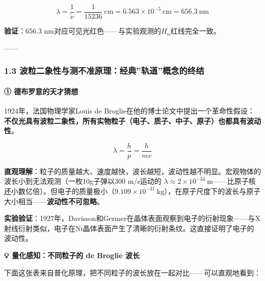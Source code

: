 \documentclass[a4paper,11pt]{ctexart}
\begin{document}
\[
\lambda = \frac{1}{\tilde{\nu}} = \frac{1}{15236}\ \mathrm{cm} = 6.563\times 10^{-5}\ \mathrm{cm} = 656.3\ \mathrm{nm}
\]

\textbf{验证}：656.3 nm对应可见光红色------与实验观测的\(H_\alpha\)红线完全一致。

------

\subsubsection{1.3 波粒二象性与测不准原理：经典''轨道''概念的终结}\label{ux6ce2ux7c92ux4e8cux8c61ux6027ux4e0eux6d4bux4e0dux51c6ux539fux7406ux7ecfux5178ux8f68ux9053ux6982ux5ff5ux7684ux7ec8ux7ed3}

\paragraph{① 德布罗意的天才猜想}\label{ux5fb7ux5e03ux7f57ux610fux7684ux5929ux624dux731cux60f3}

1924年，法国物理学家Louis de Broglie在他的博士论文中提出一个革命性假设：\textbf{不仅光具有波粒二象性，所有实物粒子（电子、质子、中子、原子）也都具有波动性}。

\[\lambda = \frac{h}{p} = \frac{h}{mv}\]

\textbf{直观理解}：粒子的质量越大、速度越快，波长越短，波动性越不明显。宏观物体的波长小到无法观测（一枚10g子弹以300 m/s运动的 \(\lambda \approx 2\times 10^{-34}\ \mathrm{m}\)------比原子核还小数亿倍）。但电子的质量极小（\(9.109\times 10^{-31}\ \mathrm{kg}\)），在原子尺度下的波长与原子大小相当------\textbf{波动性不可忽略}。

\textbf{实验验证}：1927年，Davisson和Germer在晶体表面观察到电子的衍射现象------与X射线衍射类似，电子在Ni晶体表面产生了清晰的衍射条纹。这直接证明了电子的波动性。

\textbf{💡 量化感知：不同粒子的 de Broglie 波长}

下面这张表来自普化原理，把不同粒子的波长放在一起对比------可以直观地看到：
\end{document}
